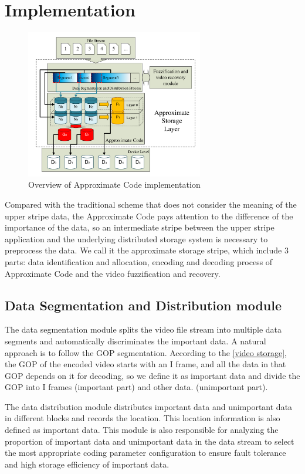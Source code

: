 \documentclass[sigconf]{acmart}
\begin{document}
\section{Implementation}\label{Implementation}
\begin{figure}[htb]
\centering
\includegraphics[height = 6.5cm]{photo/implementation-V2.pdf}
\caption{Overview of Approximate Code implementation}
\label{fig-implementation}
\end{figure}

Compared with the traditional scheme that does not consider the meaning of the upper stripe data, the Approximate Code pays attention to the difference of the importance of the data, so an intermediate stripe between the upper stripe application and the underlying distributed storage system is necessary to preprocess the data. We call it the approximate storage stripe, which include 3 parts: data identification and allocation, encoding and decoding process of Approximate Code and the video fuzzification and recovery.

\subsection{Data Segmentation and Distribution module}
The data segmentation module splits the video file stream into multiple data segments and automatically discriminates the important data. A natural approach is to follow the GOP segmentation. According to the \ref{video storage}, the GOP of the encoded video starts with an I frame, and all the data in that GOP depends on it for decoding, so we define it as important data and divide the GOP into I frames (important part) and other data. (unimportant part).

The data distribution module distributes important data and unimportant data in different blocks and records the location. This location information is also defined as important data. This module is also responsible for analyzing the proportion of important data and unimportant data in the data stream to select the most appropriate coding parameter configuration to ensure fault tolerance and high storage efficiency of important data.
\end{document}
